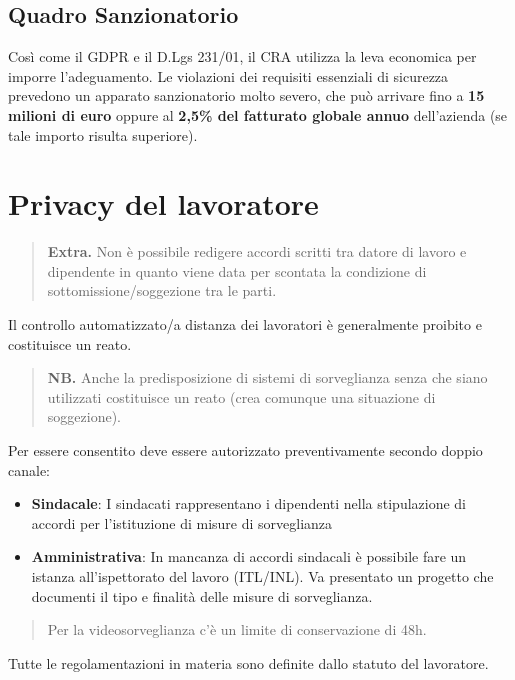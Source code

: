 \documentclass[11pt,a4paper]{article}
\begin{document}
\subsection{Quadro Sanzionatorio}
Così come il GDPR e il D.Lgs 231/01, il CRA utilizza la leva economica per imporre l'adeguamento. Le violazioni dei requisiti essenziali di sicurezza prevedono un apparato sanzionatorio molto severo, che può arrivare fino a \textbf{15 milioni di euro} oppure al \textbf{2,5\% del fatturato globale annuo} dell'azienda (se tale importo risulta superiore).


\section{Privacy del lavoratore}

\begin{quote}
\textbf{Extra.} Non è possibile redigere accordi scritti tra datore di lavoro e dipendente in quanto viene data per scontata la condizione di sottomissione/soggezione tra le parti.
\end{quote}

Il controllo automatizzato/a distanza dei lavoratori è generalmente proibito e costituisce un reato.
\begin{quote}
\textbf{NB.} Anche la predisposizione di sistemi di sorveglianza senza che siano utilizzati costituisce un reato (crea comunque una situazione di soggezione).
\end{quote}

Per essere consentito deve essere autorizzato preventivamente secondo doppio canale:
\begin{itemize}
    \item \textbf{Sindacale}: I sindacati rappresentano i dipendenti nella stipulazione di accordi per l'istituzione di misure di sorveglianza 
    \item \textbf{Amministrativa}: In mancanza di accordi sindacali è possibile fare un istanza all'ispettorato del lavoro (ITL/INL). Va presentato un progetto che documenti il tipo e finalità delle misure di sorveglianza.
\end{itemize}

\begin{quote}
Per la videosorveglianza c'è un limite di conservazione di 48h.
\end{quote}

Tutte le regolamentazioni in materia sono definite dallo statuto del lavoratore.
\end{document}
